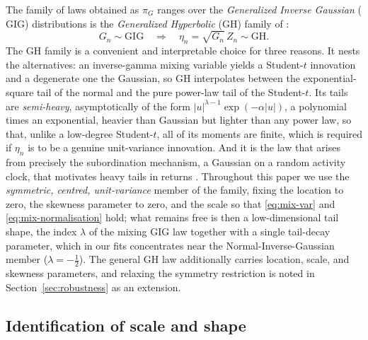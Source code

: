 \documentclass[11pt]{article}
\theoremstyle{plain}
\theoremstyle{definition}
\newcommand{\GIG}{\mathrm{GIG}}
\newcommand{\GH}{\mathrm{GH}}
\begin{document}
The family of laws obtained as $\pi_G$ ranges over the \emph{Generalized Inverse
Gaussian} ($\GIG$) distributions is the \emph{Generalized Hyperbolic} ($\GH$) family
of \citet{barndorffnielsen1977,barndorffnielsen1997}:
\begin{equation}
  G_n \sim \GIG \quad\Longrightarrow\quad \eta_n = \sqrt{G_n}\,Z_n \sim \GH.
  \label{eq:gig-gh}
\end{equation}
The $\GH$ family is a convenient and interpretable choice for three reasons. It
nests the alternatives:
an inverse-gamma mixing variable yields a Student-$t$ innovation \citep{bollerslev1987}
and a degenerate one the Gaussian, so $\GH$ interpolates between the
exponential-square tail of the normal and the pure power-law tail of the
Student-$t$. Its tails are \emph{semi-heavy}, asymptotically of the form
$|u|^{\lambda-1}\exp(-\alpha|u|)$, a polynomial times an exponential, heavier than
Gaussian but lighter than any power law, so that, unlike a low-degree Student-$t$,
all of its moments are finite, which is required if $\eta_n$ is to be a genuine
unit-variance innovation. And it is the law that arises from precisely the
subordination mechanism, a Gaussian on a random activity clock, that motivates
heavy tails in returns \citep{clark1973}. Throughout this paper we use the
\emph{symmetric, centred, unit-variance} member of the family, fixing the location
to zero, the skewness parameter to zero, and the scale so that \eqref{eq:mix-var}
and \eqref{eq:mix-normalisation} hold; what remains free is then a low-dimensional tail
shape, the index $\lambda$ of the mixing $\GIG$ law together with a single
tail-decay parameter, which in our fits concentrates near the
Normal-Inverse-Gaussian member ($\lambda=-\tfrac12$). The general $\GH$ law additionally carries location, scale, and skewness
parameters, and relaxing the symmetry restriction is noted in
Section~\ref{sec:robustness} as an extension.

\subsection{Identification of scale and shape}
\label{sub:identification}
\end{document}
